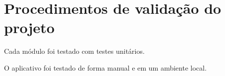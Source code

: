 \chapter{Procedimentos de validação do projeto}
\label{c.validacao}


Cada módulo foi testado com testes unitários.

O aplicativo foi testado de forma manual e em um ambiente local.
